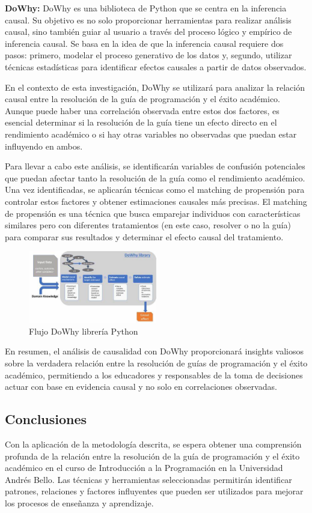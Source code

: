 \textbf{DoWhy:} DoWhy es una biblioteca de Python que se centra en la inferencia causal. Su objetivo es no solo proporcionar herramientas para realizar análisis causal, sino también guiar al usuario a través del proceso lógico y empírico de inferencia causal. Se basa en la idea de que la inferencia causal requiere dos pasos: primero, modelar el proceso generativo de los datos y, segundo, utilizar técnicas estadísticas para identificar efectos causales a partir de datos observados.

En el contexto de esta investigación, DoWhy se utilizará para analizar la relación causal entre la resolución de la guía de programación y el éxito académico. Aunque puede haber una correlación observada entre estos dos factores, es esencial determinar si la resolución de la guía tiene un efecto directo en el rendimiento académico o si hay otras variables no observadas que puedan estar influyendo en ambos.

Para llevar a cabo este análisis, se identificarán variables de confusión potenciales que puedan afectar tanto la resolución de la guía como el rendimiento académico. Una vez identificadas, se aplicarán técnicas como el matching de propensión para controlar estos factores y obtener estimaciones causales más precisas. El matching de propensión es una técnica que busca emparejar individuos con características similares pero con diferentes tratamientos (en este caso, resolver o no la guía) para comparar sus resultados y determinar el efecto causal del tratamiento.

\begin{figure}[H]
  \centering
  \includegraphics[width=0.5\textwidth]{img/dowhy.jpg}
  \caption{Flujo DoWhy librería Python}
  \label{fig:dowhy_lib}
\end{figure}

En resumen, el análisis de causalidad con DoWhy proporcionará insights valiosos sobre la verdadera relación entre la resolución de guías de programación y el éxito académico, permitiendo a los educadores y responsables de la toma de decisiones actuar con base en evidencia causal y no solo en correlaciones observadas.


\subsection{Conclusiones}

Con la aplicación de la metodología descrita, se espera obtener una comprensión profunda de la relación entre la resolución de la guía de programación y el éxito académico en el curso de Introducción a la Programación en la Universidad Andrés Bello. Las técnicas y herramientas seleccionadas permitirán identificar patrones, relaciones y factores influyentes que pueden ser utilizados para mejorar los procesos de enseñanza y aprendizaje.